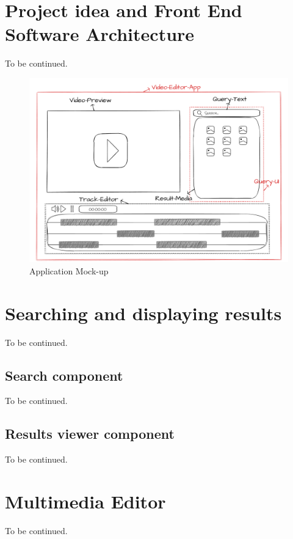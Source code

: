 \section{Project idea and Front End Software Architecture}

To be continued.

\begin{figure}[H]
\centering
\includegraphics[width=1\textwidth]{images/Wireframe.png}
\caption{Application Mock-up}
\label{fig:appMockUp}
\end{figure}

\section{Searching and displaying results}

To be continued.

\subsection{Search component}

To be continued.

\subsection{Results viewer component}

To be continued.

\section{Multimedia Editor}

To be continued.

